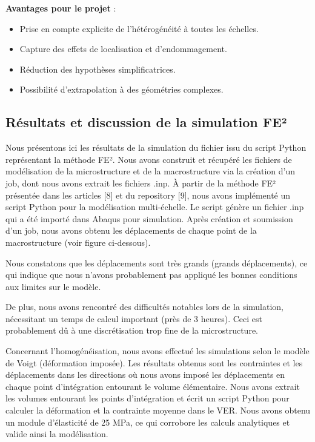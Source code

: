 \documentclass{rapportECL}
\begin{document}
\vspace{20pt}

\begin{framed}
\noindent\textbf{Avantages pour le projet} :
\begin{itemize}
\item Prise en compte explicite de l'hétérogénéité à toutes les échelles.
\item Capture des effets de localisation et d'endommagement.
\item Réduction des hypothèses simplificatrices.
\item Possibilité d'extrapolation à des géométries complexes.
\end{itemize}
\end{framed}

\subsection{Résultats et discussion de la simulation FE²}
Nous présentons ici les résultats de la simulation du fichier issu du script Python représentant la méthode FE². Nous avons construit et récupéré les fichiers de modélisation de la microstructure et de la macrostructure via la création d'un job, dont nous avons extrait les fichiers .inp. À partir de la méthode FE² présentée dans les articles [8] et du repository [9], nous avons implémenté un script Python pour la modélisation multi-échelle. Le script génère un fichier .inp qui a été importé dans Abaqus pour simulation. Après création et soumission d'un job, nous avons obtenu les déplacements de chaque point de la macrostructure (voir figure ci-dessous).

Nous constatons que les déplacements sont très grands (grands déplacements), ce qui indique que nous n'avons probablement pas appliqué les bonnes conditions aux limites sur le modèle.

De plus, nous avons rencontré des difficultés notables lors de la simulation, nécessitant un temps de calcul important (près de 3 heures). Ceci est probablement dû à une discrétisation trop fine de la microstructure.

Concernant l'homogénéisation, nous avons effectué les simulations selon le modèle de Voigt (déformation imposée). Les résultats obtenus sont les contraintes et les déplacements dans les directions où nous avons imposé les déplacements en chaque point d'intégration entourant le volume élémentaire. Nous avons extrait les volumes entourant les points d'intégration et écrit un script Python pour calculer la déformation et la contrainte moyenne dans le VER. Nous avons obtenu un module d'élasticité de 25 MPa, ce qui corrobore les calculs analytiques et valide ainsi la modélisation.
\end{document}
